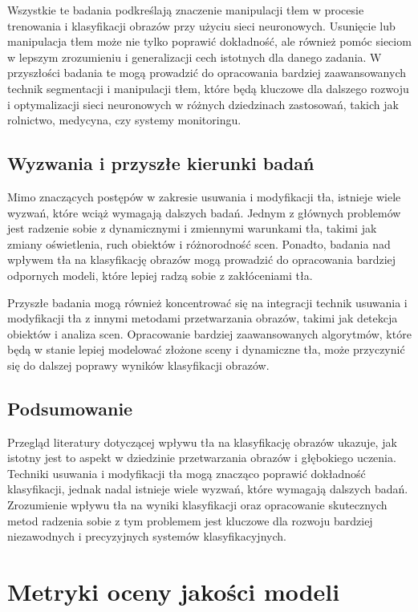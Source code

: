 Wszystkie te badania podkreślają znaczenie manipulacji tłem w procesie trenowania i klasyfikacji 
obrazów przy użyciu sieci neuronowych. Usunięcie lub manipulacja tłem może nie tylko poprawić 
dokładność, ale również pomóc sieciom w lepszym zrozumieniu i generalizacji cech istotnych dla 
danego zadania. W przyszłości badania te mogą prowadzić do opracowania bardziej zaawansowanych 
technik segmentacji i manipulacji tłem, które będą kluczowe dla dalszego rozwoju i optymalizacji 
sieci neuronowych w różnych dziedzinach zastosowań, takich jak rolnictwo, medycyna, czy systemy 
monitoringu.

\subsection*{Wyzwania i przyszłe kierunki badań}

Mimo znaczących postępów w zakresie usuwania i modyfikacji tła, istnieje wiele wyzwań, które wciąż 
wymagają dalszych badań. Jednym z głównych problemów jest radzenie sobie z dynamicznymi i zmiennymi 
warunkami tła, takimi jak zmiany oświetlenia, ruch obiektów i różnorodność scen. Ponadto, badania nad 
wpływem tła na klasyfikację obrazów mogą prowadzić do opracowania bardziej odpornych modeli, które 
lepiej radzą sobie z zakłóceniami tła.

Przyszłe badania mogą również koncentrować się na integracji technik usuwania i modyfikacji tła z 
innymi metodami przetwarzania obrazów, takimi jak detekcja obiektów i analiza scen. Opracowanie 
bardziej zaawansowanych algorytmów, które będą w stanie lepiej modelować złożone sceny i dynamiczne 
tła, może przyczynić się do dalszej poprawy wyników klasyfikacji obrazów.

\subsection*{Podsumowanie}

Przegląd literatury dotyczącej wpływu tła na klasyfikację obrazów ukazuje, jak istotny jest to 
aspekt w dziedzinie przetwarzania obrazów i głębokiego uczenia. Techniki usuwania i modyfikacji 
tła mogą znacząco poprawić dokładność klasyfikacji, jednak nadal istnieje wiele wyzwań, które 
wymagają dalszych badań. Zrozumienie wpływu tła na wyniki klasyfikacji oraz opracowanie skutecznych 
metod radzenia sobie z tym problemem jest kluczowe dla rozwoju bardziej niezawodnych i precyzyjnych 
systemów klasyfikacyjnych.

\section*{Metryki oceny jakości modeli}

